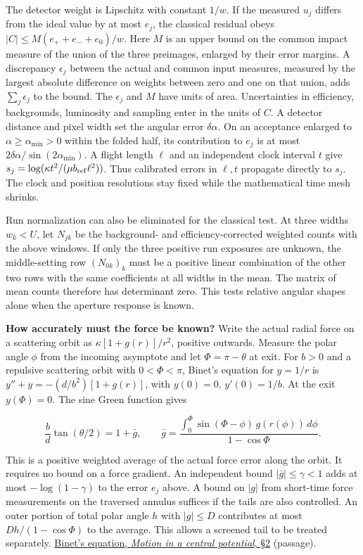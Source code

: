 \documentclass[11pt,a4paper]{article}
\begin{document}
The detector weight is Lipschitz with constant \(1/w\). If the measured
\(u_j\) differs from the ideal value by at most \(e_j\), the classical
residual obeys \(|C|\le M(e_++e_-+e_0)/w\). Here \(M\) is an upper bound
on the common impact measure of the union of the three preimages,
enlarged by their error margins. A discrepancy \(\epsilon_j\) between
the actual and common input measures, measured by the largest absolute
difference on weights between zero and one on that union, adds
\(\sum_j\epsilon_j\) to the bound. The \(\epsilon_j\) and \(M\) have
units of area. Uncertainties in efficiency, backgrounds, luminosity and
sampling enter in the units of \(C\). A detector distance and pixel
width set the angular error \(\delta\alpha\). On an acceptance enlarged
to \(\alpha\ge\alpha_{\min}>0\) within the folded half, its contribution
to \(e_j\) is at most \(2\delta\alpha/\sin(2\alpha_{\min})\). A flight
length \(\ell\) and an independent clock interval \(t\) give
\(s_j=\log(\kappa t^2/(\mu b_{\rm ref}\ell^2))\). Thus calibrated errors
in \(\ell,t\) propagate directly to \(s_j\). The clock and position
resolutions stay fixed while the mathematical time mesh shrinks.

Run normalization can also be eliminated for the classical test. At
three widths \(w_k<U\), let \(N_{jk}\) be the background- and
efficiency-corrected weighted counts with the above windows. If only the
three positive run exposures are unknown, the middle-setting row
\((N_{0k})_k\) must be a positive linear combination of the other two
rows with the same coefficients at all widths in the mean. The matrix of
mean counts therefore has determinant zero. This tests relative angular
shapes alone when the aperture response is known.

\textbf{How accurately must the force be known?} Write the actual radial
force on a scattering orbit as \(\kappa[1+g(r)]/r^2\), positive
outwards. Measure the polar angle \(\phi\) from the incoming asymptote
and let \(\Phi=\pi-\theta\) at exit. For \(b>0\) and a repulsive
scattering orbit with \(0<\Phi<\pi\), Binet's equation for \(y=1/r\) is
\(y''+y=-(d/b^2)[1+g(r)]\), with \(y(0)=0\), \(y'(0)=1/b\). At the exit
\(y(\Phi)=0\). The sine Green function gives

\[
 \frac{b}{d}\tan(\theta/2)=1+\bar g,\qquad
 \bar g=\frac{\int_0^\Phi\sin(\Phi-\phi)\,g(r(\phi))\,d\phi}
                    {1-\cos\Phi}.
\]

This is a positive weighted average of the actual force error along the
orbit. It requires no bound on a force gradient. An independent bound
\(|\bar g|\le\gamma<1\) adds at most \(-\log(1-\gamma)\) to the error
\(e_j\) above. A bound on \(|g|\) from short-time force measurements on
the traversed annulus suffices if the tails are also controlled. An
outer portion of total polar angle \(h\) with \(|g|\le D\) contributes
at most \(Dh/(1-\cos\Phi)\) to the average. This allows a screened tail
to be treated separately.
\href{https://teorica.fis.ucm.es/artemio/Notas\%20de\%20curso/CM.pdf}{Binet's
equation, \emph{Motion in a central potential}, §2} (passage).
\end{document}
